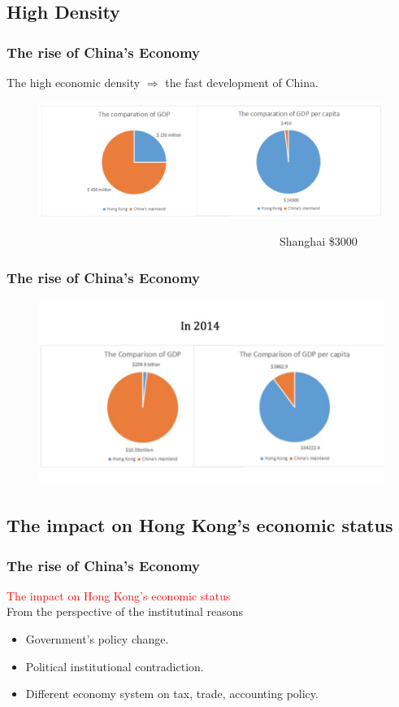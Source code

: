 \documentclass[slidestop,uncompress,mathsans, 12pt]{beamer}
\begin{document}
\subsection{High Density}
\begin{frame}
\frametitle{The rise of China's Economy}
The high economic density $\Longrightarrow$ the fast development of China.
\\
\bigskip
{}
\begin{figure}[h]
\centering
\includegraphics[width=1\textwidth]{hk5.jpg}
\label{threadsVsSync}
\end{figure}
~~~~~~~~~~~~~~~~~~~~~~~~~~~~~~~~~~~~~~~~~~~~~~~~Shanghai \$$3000$
\end{frame}
\begin{frame}
\frametitle{The rise of China's Economy}
\begin{figure}[h]
\centering
\includegraphics[width=1\textwidth]{hk25.png}
\label{threadsVsSync}
\end{figure}
\end{frame}

\subsection{The impact on Hong Kong's economic status}
\begin{frame}
\frametitle{The rise of China's Economy}
\textcolor{red}{The impact on Hong Kong's economic status}\\
\bigskip
From the perspective of the institutinal reasons\\

\bigskip
\begin{itemize}
\item Government's policy change.
\bigskip
\item Political institutional contradiction.
\bigskip
\item Different economy system on tax, trade, accounting policy.
\end{itemize}

\end{frame}
\end{document}
